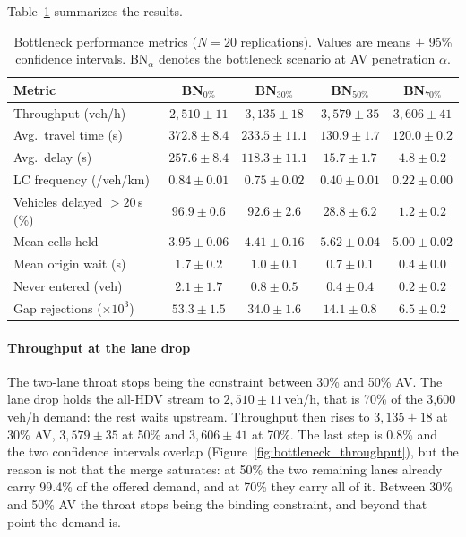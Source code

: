 \documentclass[review,number]{elsarticle}
\begin{document}
Table~\ref{tab:results_bottleneck} summarizes the results.

\begin{table}[ht]
\centering
\caption{Bottleneck performance metrics ($N = 20$ replications). Values are means $\pm$ 95\% confidence intervals. BN$_\alpha$ denotes the bottleneck scenario at AV penetration $\alpha$.}
\label{tab:results_bottleneck}
\begin{tabular}{@{}lcccc@{}}
\toprule
Metric & BN$_{0\%}$ & BN$_{30\%}$ & BN$_{50\%}$ & BN$_{70\%}$ \\
\midrule
Throughput (veh/h) & $2{,}510 \pm 11$ & $3{,}135 \pm 18$ & $3{,}579 \pm 35$ & $3{,}606 \pm 41$ \\
Avg.\ travel time (s) & $372.8 \pm 8.4$ & $233.5 \pm 11.1$ & $130.9 \pm 1.7$ & $120.0 \pm 0.2$ \\
Avg.\ delay (s) & $257.6 \pm 8.4$ & $118.3 \pm 11.1$ & $15.7 \pm 1.7$ & $4.8 \pm 0.2$ \\
LC frequency (/veh/km) & $0.84 \pm 0.01$ & $0.75 \pm 0.02$ & $0.40 \pm 0.01$ & $0.22 \pm 0.00$ \\
Vehicles delayed $>20$\,s (\%) & $96.9 \pm 0.6$ & $92.6 \pm 2.6$ & $28.8 \pm 6.2$ & $1.2 \pm 0.2$ \\
Mean cells held & $3.95 \pm 0.06$ & $4.41 \pm 0.16$ & $5.62 \pm 0.04$ & $5.00 \pm 0.02$ \\
Mean origin wait (s) & $1.7 \pm 0.2$ & $1.0 \pm 0.1$ & $0.7 \pm 0.1$ & $0.4 \pm 0.0$ \\
Never entered (veh) & $2.1 \pm 1.7$ & $0.8 \pm 0.5$ & $0.4 \pm 0.4$ & $0.2 \pm 0.2$ \\
Gap rejections ($\times 10^3$) & $53.3 \pm 1.5$ & $34.0 \pm 1.6$ & $14.1 \pm 0.8$ & $6.5 \pm 0.2$ \\
\bottomrule
\end{tabular}
\end{table}

\paragraph{Throughput at the lane drop}
The two-lane throat stops being the constraint between 30\% and 50\% AV. The lane drop holds the all-HDV stream to $2{,}510 \pm 11$\,veh/h, that is 70\% of the 3{,}600\,veh/h demand: the rest waits upstream. Throughput then rises to $3{,}135 \pm 18$ at 30\% AV, $3{,}579 \pm 35$ at 50\% and $3{,}606 \pm 41$ at 70\%. The last step is 0.8\% and the two confidence intervals overlap (Figure~\ref{fig:bottleneck_throughput}), but the reason is not that the merge saturates: at 50\% the two remaining lanes already carry 99.4\% of the offered demand, and at 70\% they carry all of it. Between 30\% and 50\% AV the throat stops being the binding constraint, and beyond that point the demand is.
\end{document}

